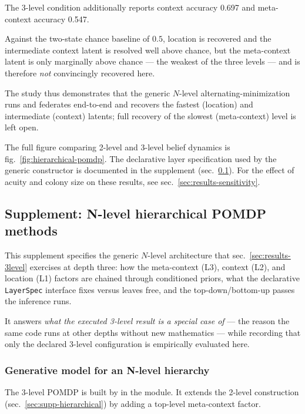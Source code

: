 \documentclass[
  english,
]{article}
\theoremstyle{plain}
\theoremstyle{definition}
\theoremstyle{remark}
\theoremstyle{definition}
\begin{document}
The 3-level condition additionally reports context accuracy 0.697 and
meta-context accuracy 0.547.

Against the two-state chance baseline of \(0.5\), location is recovered
and the intermediate context latent is resolved well above chance, but
the meta-context latent is only marginally above chance --- the weakest
of the three levels --- and is therefore \emph{not} convincingly
recovered here.

The study thus demonstrates that the generic \(N\)-level
alternating-minimization runs and federates end-to-end and recovers the
fastest (location) and intermediate (context) latents; full recovery of
the slowest (meta-context) level is left open.

The full figure comparing 2-level and 3-level belief dynamics is
fig.~\ref{fig:hierarchical-pomdp}. The declarative layer specification
used by the generic constructor is documented in the supplement
(sec.~\ref{sec:supp-3level}). For the effect of acuity and colony size
on these results, see sec.~\ref{sec:results-sensitivity}.

\subsection{Supplement: N-level hierarchical POMDP
methods}\label{sec:supp-3level}

This supplement specifies the generic \(N\)-level architecture that
sec.~\ref{sec:results-3level} exercises at depth three: how the
meta-context (L3), context (L2), and location (L1) factors are chained
through conditioned priors, what the declarative \texttt{LayerSpec}
interface fixes versus leaves free, and the top-down/bottom-up passes
the inference runs.

It answers \emph{what the executed 3-level result is a special case of}
--- the reason the same code runs at other depths without new
mathematics --- while recording that only the declared 3-level
configuration is empirically evaluated here.

\subsubsection{Generative model for an N-level
hierarchy}\label{generative-model-for-an-n-level-hierarchy}

The 3-level POMDP is built by  in the
 module. It extends the 2-level construction
(sec.~\ref{sec:supp-hierarchical}) by adding a top-level meta-context
factor.
\end{document}
